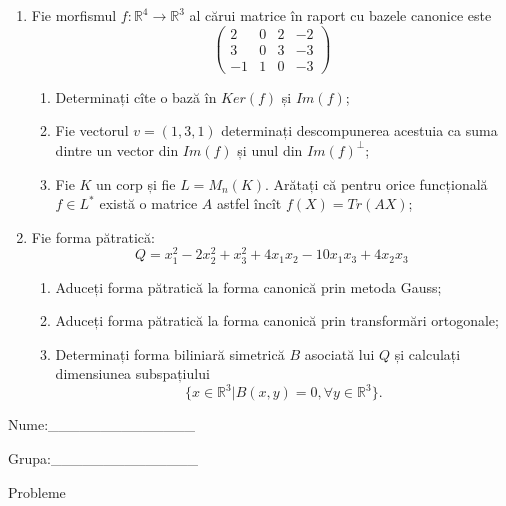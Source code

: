 \documentclass{article}
\begin{document}
\begin{enumerate}
 \item Fie morfismul $f:\mathbb{R}^4 \to \mathbb{R}^3$ al cărui matrice în raport cu bazele canonice este
$$\begin{pmatrix}
2&0&2&-2\\
3&0&3&-3\\
-1&1&0&-3
\end{pmatrix}$$

\begin{enumerate}
\item Determinați cîte o bază în $Ker(f)$ și $Im(f)$;
\item Fie vectorul $v=(1,3,1)$ determinați descompunerea acestuia ca suma dintre un vector din $Im(f)$ și unul din $Im(f)^\perp$;
\item Fie $K$ un corp și fie $L=M_n(K)$. Arătați că pentru orice funcțională $f \in L^*$ există o matrice $A$ astfel încît $f(X)=Tr(AX)$;
\end{enumerate}
\item Fie forma pătratică:
$$Q= x_1^2-2x_2^2+x_3^2+4x_1x_2-10x_1x_3+4x_2x_3$$

\begin{enumerate}
\item Aduceți forma pătratică la forma canonică prin metoda Gauss;
\item Aduceți forma pătratică la forma canonică prin transformări ortogonale;
\item Determinați forma biliniară simetrică $B$ asociată lui $Q$ și calculați dimensiunea subspațiului
$$\{x \in \mathbb{R}^3 | B(x,y)=0,\forall y \in \mathbb{R}^3\}.$$

\end{enumerate}
\end{enumerate}
\newpage
\begin{flushright}
Nume:\_\_\_\_\_\_\_\_\_\_\_\_\_\_
 
 
Grupa:\_\_\_\_\_\_\_\_\_\_\_\_\_\_
\end{flushright}
\begin{center}
\vspace{2cm}
{\Large Probleme}
\vspace{2cm}
\end{center}
\end{document}
